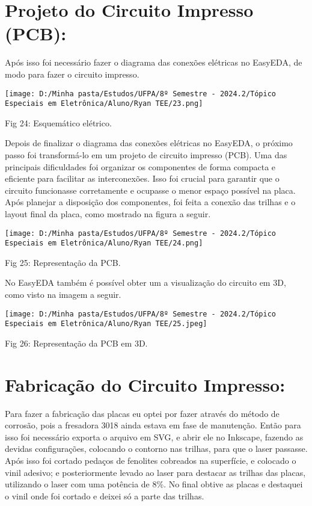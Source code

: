 \documentclass[
]{book}
\begin{document}
\section{Projeto do Circuito Impresso (PCB):}\label{projeto-do-circuito-impresso-pcb}

Após isso foi necessário fazer o diagrama das conexões elétricas no EasyEDA, de modo para fazer o circuito impresso.

\texttt{[image: D:/Minha pasta/Estudos/UFPA/8º Semestre - 2024.2/Tópico Especiais em Eletrônica/Aluno/Ryan TEE/23.png]}

Fig 24: Esquemático elétrico.

Depois de finalizar o diagrama das conexões elétricas no EasyEDA, o próximo passo foi transformá-lo em um projeto de circuito impresso (PCB). Uma das principais dificuldades foi organizar os componentes de forma compacta e eficiente para facilitar as interconexões. Isso foi crucial para garantir que o circuito funcionasse corretamente e ocupasse o menor espaço possível na placa.
Após planejar a disposição dos componentes, foi feita a conexão das trilhas e o layout final da placa, como mostrado na figura a seguir.

\texttt{[image: D:/Minha pasta/Estudos/UFPA/8º Semestre - 2024.2/Tópico Especiais em Eletrônica/Aluno/Ryan TEE/24.png]}

Fig 25: Representação da PCB.

No EasyEDA também é possível obter um a visualização do circuito em 3D, como visto na imagem a seguir.

\texttt{[image: D:/Minha pasta/Estudos/UFPA/8º Semestre - 2024.2/Tópico Especiais em Eletrônica/Aluno/Ryan TEE/25.jpeg]}

Fig 26: Representação da PCB em 3D.

\section{Fabricação do Circuito Impresso:}\label{fabricauxe7uxe3o-do-circuito-impresso}

Para fazer a fabricação das placas eu optei por fazer através do método de corrosão, pois a fresadora 3018 ainda estava em fase de manutenção. Então para isso foi necessário exporta o arquivo em SVG, e abrir ele no Inkscape, fazendo as devidas configurações, colocando o contorno nas trilhas, para que o laser passasse. Após isso foi cortado pedaços de fenolites cobreados na superfície, e colocado o vinil adesivo; e posteriormente levado ao laser para destacar as trilhas das placas, utilizando o laser com uma potência de 8\%. No final obtive as placas e destaquei o vinil onde foi cortado e deixei só a parte das trilhas.
\end{document}
